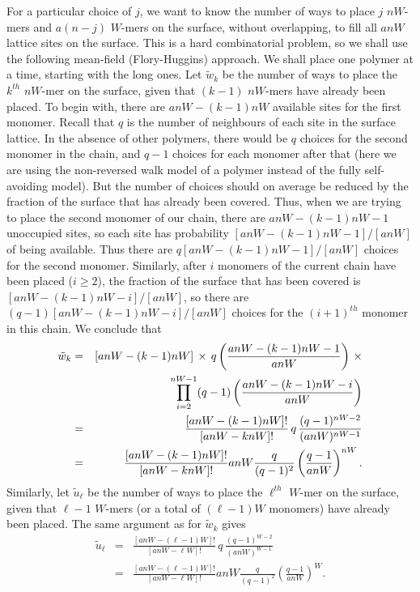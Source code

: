 \documentclass[journal=jacsat,manuscript=article]{achemso}
\begin{document}
For a particular choice of $j$, we want to know the number of ways to place $j$ $nW$-mers 
and $a(n-j)$ $W$-mers on the surface, without overlapping, to fill all $anW$ lattice sites on the surface.
This is a hard combinatorial problem, so we shall use the following mean-field (Flory-Huggins) approach.
We shall place one polymer at a time, starting with the long ones.
Let $\tilde{w}_k$ be the number of ways to place the $k^{th}$ $nW$-mer on the surface, given that
$(k-1)$ $nW$-mers have already been placed.  
To begin with, there are $anW-(k-1)nW$ available sites for the first monomer.  Recall that  $q$ is the number of
neighbours of each site in the surface lattice.
In the absence of other polymers, there would be $q$ choices for the second monomer in the chain,
and $q-1$ choices for each monomer after that (here we are using the non-reversed walk model of a polymer
instead of the fully self-avoiding model).  But the number of choices should on average be reduced 
by the fraction of the surface that has already been covered.  
Thus, when we are trying to place the second monomer of our chain, there are
$anW-(k-1)nW-1$ unoccupied sites, so each site has 
probability $[anW-(k-1)nW-1]/[anW]$ of being available.  
Thus there are $q[anW-(k-1)nW-1]/[anW]$ choices for the second monomer.  
Similarly, after $i$ monomers of the current chain have been placed ($i\geq 2$), the fraction of the
surface that has been covered is $[anW-(k-1)nW-i]/[anW]$, so there are 
$(q-1)[anW-(k-1)nW-i]/[anW]$ choices for the $(i+1)^{th}$ monomer in this chain.  
We conclude that 
\begin{eqnarray}
   \tilde{w}_k  & = &   [anW-(k-1)nW]\,\times \,q\left(\frac{ anW-(k-1)nW-1}{anW}\right)    \,\times
   \nonumber    \\
   & &    \hspace{22mm}
     \prod_{i=2}^{nW-1}(q-1)\left(\frac{ anW-(k-1)nW-i}{anW}\right)  
      \nonumber \\
 & = &    \frac{[anW-(k-1)nW]!}{[anW-knW]!} \,q\,  \frac{(q-1)^{nW-2}}{(anW)^{nW-1}}  
     \nonumber    \\
     & = &    \frac{[anW-(k-1)nW]!}{[anW-knW]!}   anW \frac{q}{(q-1)^2}\left(  \frac{q-1}{anW}\right)^{nW}.
     \label{eq.wk2}
\end{eqnarray}
Similarly, let $\tilde{u}_{\ell}$ be the number of ways to place the $\ell^{th}$ $W$-mer on the surface, given that
${\ell}-1$ $W$-mers (or a total of $(\ell-1)W$ monomers) have already been placed.   The same 
argument as for $\tilde{w}_k$ gives
\begin{eqnarray}
   \tilde{u}_{\ell}  
 & = &    \frac{[anW-(\ell-1)W]!}{[anW-\ell W]!} \,q\,  \frac{(q-1)^{W-2}}{(anW)^{W-1}}  
     \nonumber    \\
     & = &    \frac{[anW-(\ell-1)W]!}{[anW-\ell W]!}   anW \frac{q}{(q-1)^2}\left(  \frac{q-1}{anW}\right)^{W}.
     \label{eq.uell2}
\end{eqnarray}
\end{document}
